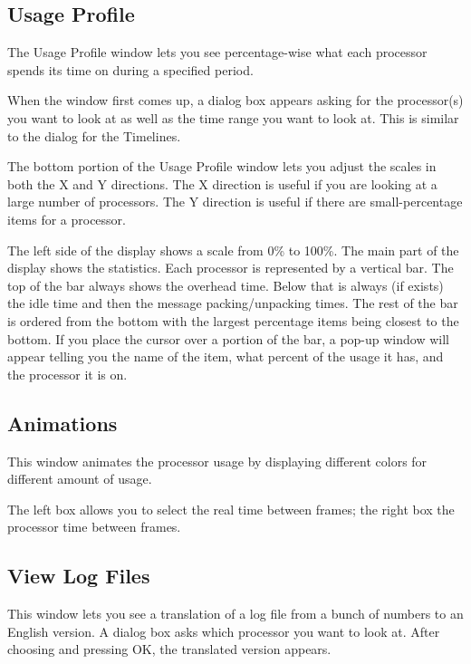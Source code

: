 \documentclass[10pt,dvips]{article}
\begin{document}
\begin{enumerate}
   \end{enumerate}

\subsection{Usage Profile}

   The Usage Profile window lets you see percentage-wise what each processor
   spends its time on during a specified period.

   When the window first comes up, a dialog box appears asking for the
   processor(s) you want to look at as well as the time range you want to look
   at.  This is similar to the dialog for the Timelines.

   The bottom portion of the Usage Profile window lets you adjust the scales in
   both the X and Y directions.  The X direction is useful if you are looking at
   a large number of processors.  The Y direction is useful if there are
   small-percentage items for a processor.

   The left side of the display shows a scale from 0\% to 100\%.  The main part of
   the display shows the statistics.  Each processor is represented by a
   vertical bar.  The top of the bar always shows the overhead time.  Below that
   is always (if exists) the idle time and then the message packing/unpacking
   times.  The rest of the bar is ordered from the bottom with the largest
   percentage items being closest to the bottom.  If you place the cursor over a
   portion of the bar, a pop-up window will appear telling you the name of the
   item, what percent of the usage it has, and the processor it is on.

\subsection{Animations}

   This window animates the processor usage by displaying
   different colors for different amount of usage.

   The left box allows you to select the real time between frames;
   the right box the processor time between frames.


\subsection{View Log Files}

   This window lets you see a translation of a log file from a bunch of numbers
   to an English version.  A dialog box asks which processor you want to look
   at.  After choosing and pressing OK, the translated version appears.
\end{document}
